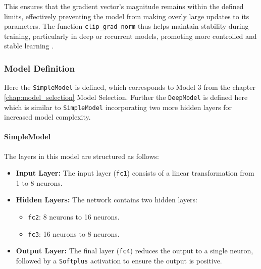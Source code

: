 This ensures that the gradient vector's magnitude remains within the defined limits, effectively preventing the model from making overly large updates to its parameters. The function \texttt{clip\_grad\_norm} thus helps maintain stability during training, particularly in deep or recurrent models, promoting more controlled and stable learning \citep{pytorch_clip_grad_norm, zhang2020gradient}.

\label{Def:Clip}




\subsubsection{Model Definition}
Here the \texttt{SimpleModel} is defined, which corresponds to Model 3 from the chapter \ref{chap:model_selection} Model Selection.
Further the \texttt{DeepModel} is defined here which is similar to \texttt{SimpleModel} incorporating two more hidden layers for increased model complexity.

\paragraph{SimpleModel}
The layers in this model are structured as follows:
\begin{itemize}
    \item \textbf{Input Layer:} The input layer (\texttt{fc1}) consists of a linear transformation from 1 to 8 neurons.
    \item \textbf{Hidden Layers:} The network contains two hidden layers:
    \begin{itemize}
        \item \texttt{fc2}: 8 neurons to 16 neurons.
        \item \texttt{fc3}: 16 neurons to 8 neurons.
    \end{itemize}
    \item \textbf{Output Layer:} The final layer (\texttt{fc4}) reduces the output to a single neuron, followed by a \texttt{Softplus} activation to ensure the output is positive.
\end{itemize}

